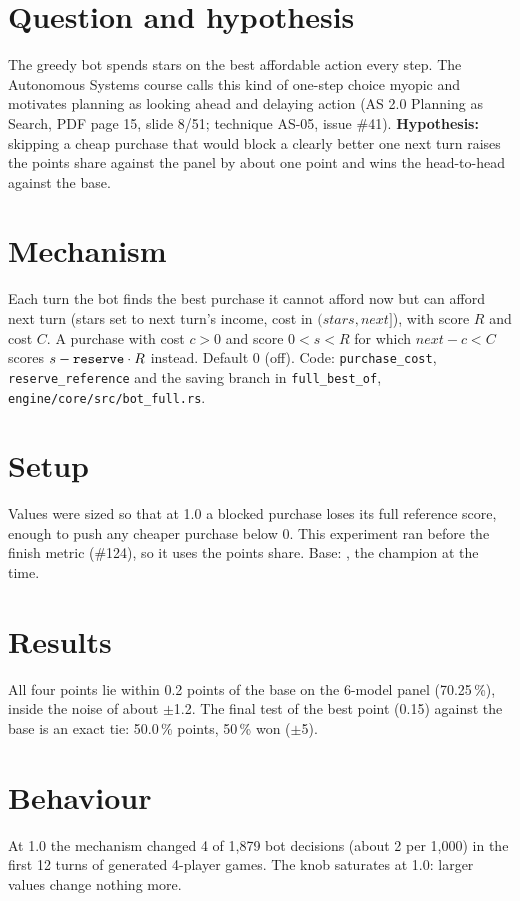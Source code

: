 \documentclass{../polyexp}
\begin{document}

\ExpHeader

\section{Question and hypothesis}
The greedy bot spends stars on the best affordable action every step. The Autonomous Systems course calls this kind of one-step choice myopic and motivates planning as looking ahead and delaying action (AS 2.0 Planning as Search, PDF page 15, slide 8/51; technique AS-05, issue \#41). \textbf{Hypothesis:} skipping a cheap purchase that would block a clearly better one next turn raises the points share against the panel by about one point and wins the head-to-head against the base.

\section{Mechanism}
Each turn the bot finds the best purchase it cannot afford now but can afford next turn (stars set to next turn's income, cost in $(\mathit{stars}, \mathit{next}]$), with score $R$ and cost $C$. A purchase with cost $c>0$ and score $0<s<R$ for which $\mathit{next}-c<C$ scores $s-\texttt{reserve}\cdot R$ instead. Default 0 (off). Code: \texttt{purchase\_cost}, \texttt{reserve\_reference} and the saving branch in \texttt{full\_best\_of}, \texttt{engine/core/src/bot\_full.rs}.

\section{Setup}
Values were sized so that at 1.0 a blocked purchase loses its full reference score, enough to push any cheaper purchase below 0. This experiment ran before the finish metric (\#124), so it uses the points share. Base: , the champion at the time.

\section{Results}
\ExpResults

All four points lie within 0.2 points of the base on the 6-model panel (70.25\,\%), inside the noise of about $\pm$1.2. The final test of the best point (0.15) against the base is an exact tie: 50.0\,\% points, 50\,\% won ($\pm$5).

\section{Behaviour}
At  1.0 the mechanism changed 4 of 1,879 bot decisions (about 2 per 1,000) in the first 12 turns of generated 4-player games. The knob saturates at 1.0: larger values change nothing more.
\end{document}
